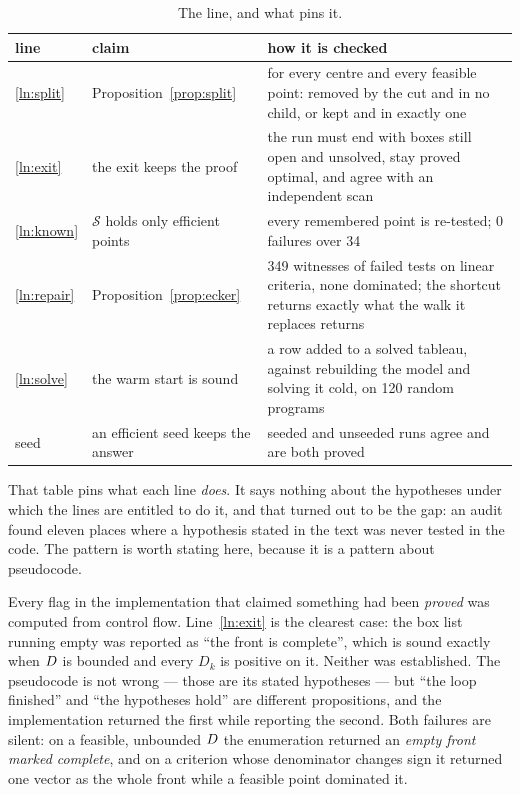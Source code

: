 \documentclass[11pt,a4paper]{article}
\begin{document}
\begin{table}[h]
\centering
\caption{The line, and what pins it.}
\begin{tabular}{llp{6.6cm}}
\toprule
line & claim & how it is checked \\
\midrule
\ref{ln:split} & Proposition~\ref{prop:split} & for every centre and every
  feasible point: removed by the cut and in no child, or kept and in exactly
  one \\
\ref{ln:exit} & the exit keeps the proof & the run must end with boxes still
  open and unsolved, stay proved optimal, and agree with an independent scan \\
\ref{ln:known} & $\mathcal{S}$ holds only efficient points & every remembered
  point is re-tested; 0 failures over 34 \\
\ref{ln:repair} & Proposition~\ref{prop:ecker} & 349 witnesses of failed tests
  on linear criteria, none dominated; the shortcut returns exactly what the
  walk it replaces returns \\
\ref{ln:solve} & the warm start is sound & a row added to a solved tableau,
  against rebuilding the model and solving it cold, on 120 random programs \\
seed & an efficient seed keeps the answer & seeded and unseeded runs agree and
  are both proved \\
\bottomrule
\end{tabular}
\end{table}

\noindent
That table pins what each line \emph{does}.  It says nothing about the
hypotheses under which the lines are entitled to do it, and that turned out to
be the gap: an audit found eleven places where a hypothesis stated in the
text was never tested in the code.  The pattern is worth stating here, because
it is a pattern about pseudocode.

Every flag in the implementation that claimed something had been \emph{proved}
was computed from control flow.  Line~\ref{ln:exit} is the clearest case: the
box list running empty was reported as ``the front is complete'', which is
sound exactly when $D$ is bounded and every $D_k$ is positive on it.
Neither was established.  The pseudocode is not wrong --- those are its stated
hypotheses --- but ``the loop finished'' and ``the hypotheses hold'' are
different propositions, and the implementation returned the first while
reporting the second.  Both failures are silent: on a feasible, unbounded
$D$ the enumeration returned an \emph{empty front marked complete}, and
on a criterion whose denominator changes sign it returned one vector as the
whole front while a feasible point dominated it.
\end{document}
